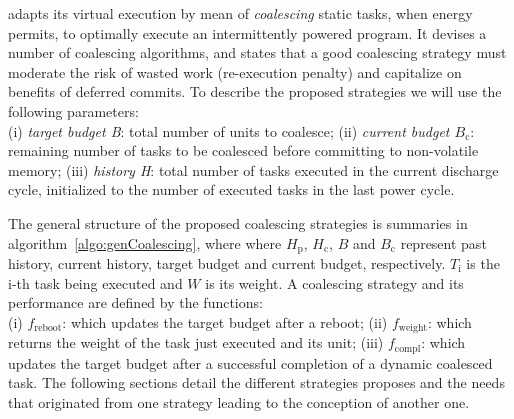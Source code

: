 
 



\sys adapts its virtual execution by mean of \emph{coalescing} static tasks, when energy permits, to optimally execute an intermittently powered program. It devises a number of coalescing algorithms, and states that a good coalescing strategy must moderate the risk of wasted work (re-execution penalty) and capitalize on benefits of deferred commits. To describe the proposed strategies we will use the following parameters: \\
(i) \textit{target budget B}: total number of units to coalesce; (ii) \textit{current budget $B_\text{c}$}: remaining number of tasks to be coalesced before committing to non-volatile memory; (iii) \textit{history H}: total number of tasks executed in the current discharge cycle, initialized to the number of executed tasks in the last power cycle. 

The general structure of the proposed coalescing strategies is summaries in algorithm~\ref{algo:genCoalescing}, where where $H_\text{p}$, $H_\text{c}$, $B$ and $B_\text{c}$ represent past history, current history, target budget and current budget, respectively. $T_\text{i}$ is the i-th task being executed and $W$ is its weight.
A coalescing strategy and its performance are defined by the functions: \\
(i) \emph{$f_\text{reboot}$}: which updates the target budget after a reboot; (ii) \emph{$f_\text{weight}$}: which returns the weight of the task just executed and its unit; (iii) \emph{$f_\text{compl}$}: which updates the target budget after a successful completion of a dynamic coalesced task. The following sections detail the different strategies \sys proposes and the needs that originated from one strategy leading to the conception of another one.

